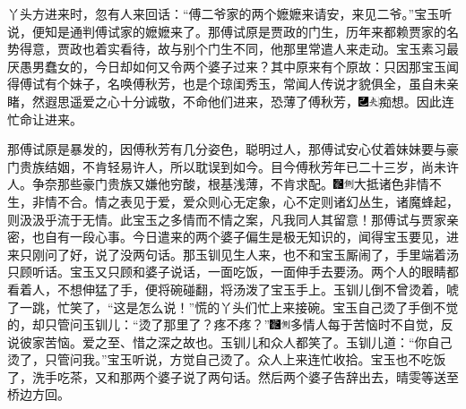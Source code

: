 丫头方进来时，忽有人来回话：“傅二爷家的两个嬷嬷来请安，来见二爷。”宝玉听说，便知是通判傅试家的嬷嬷来了。那傅试原是贾政的门生，历年来都赖贾家的名势得意，贾政也着实看待，故与别个门生不同，他那里常遣人来走动。宝玉素习最厌愚男蠢女的，今日却如何又令两个婆子过来？其中原来有个原故：只因那宝玉闻得傅试有个妹子，名唤傅秋芳，也是个琼闺秀玉，常闻人传说才貌俱全，虽自未亲睹，然遐思遥爱之心十分诚敬，不命他们进来，恐薄了傅秋芳，{\includegraphics[width=3mm]{../Images/00003}\includegraphics[width=3mm]{../Images/00012}\footnotesize \kaishu 痴想。}因此连忙命让进来。

那傅试原是暴发的，因傅秋芳有几分姿色，聪明过人，那傅试安心仗着妹妹要与豪门贵族结姻，不肯轻易许人，所以耽误到如今。目今傅秋芳年已二十三岁，尚未许人。争奈那些豪门贵族又嫌他穷酸，根基浅薄，不肯求配。{\includegraphics[width=3mm]{../Images/00006}\includegraphics[width=3mm]{../Images/00011}\footnotesize \kaishu 大抵诸色非情不生，非情不合。情之表见于爱，爱众则心无定象，心不定则诸幻丛生，诸魔蜂起，则汲汲乎流于无情。此宝玉之多情而不情之案，凡我同人其留意！}那傅试与贾家亲密，也自有一段心事。今日遣来的两个婆子偏生是极无知识的，闻得宝玉要见，进来只刚问了好，说了没两句话。那玉钏见生人来，也不和宝玉厮闹了，手里端着汤只顾听话。宝玉又只顾和婆子说话，一面吃饭，一面伸手去要汤。两个人的眼睛都看着人，不想伸猛了手，便将碗碰翻，将汤泼了宝玉手上。玉钏儿倒不曾烫着，唬了一跳，忙笑了，“这是怎么说！”慌的丫头们忙上来接碗。宝玉自己烫了手倒不觉的，却只管问玉钏儿：“烫了那里了？疼不疼？”{\includegraphics[width=3mm]{../Images/00006}\includegraphics[width=3mm]{../Images/00011}\footnotesize \kaishu 多情人每于苦恼时不自觉，反说彼家苦恼。爱之至、惜之深之故也。}玉钏儿和众人都笑了。玉钏儿道：“你自己烫了，只管问我。”宝玉听说，方觉自己烫了。众人上来连忙收拾。宝玉也不吃饭了，洗手吃茶，又和那两个婆子说了两句话。然后两个婆子告辞出去，晴雯等送至桥边方回。

